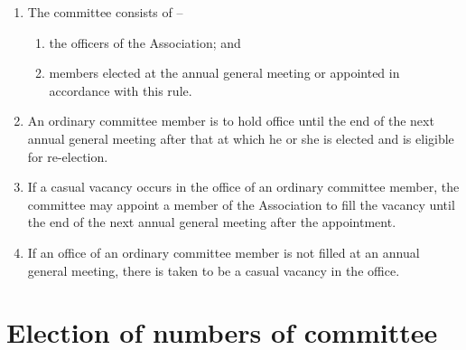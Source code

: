 \documentclass[a4paper,11pt]{article}
\begin{document}
\begin{enumerate}
	\item The committee consists of --
	\begin{enumerate}
		\item the officers of the Association; and
		\item \orgCommitteeExtras{} members elected at the annual general meeting or appointed in accordance with this rule.
	\end{enumerate}
	
	\item An ordinary committee member is to hold office until the end of the next annual general meeting after that at which he or she is elected and is eligible for re-election.
	\item If a casual vacancy occurs in the office of an ordinary committee member, the committee may appoint a member of the Association to fill the vacancy until the end of the next annual general meeting after the appointment.
	\item If an office of an ordinary committee member is not filled at an annual general meeting, there is taken to be a casual vacancy in the office.
\end{enumerate}

\section{Election of numbers of committee}
\label{rule:election}
\end{document}

